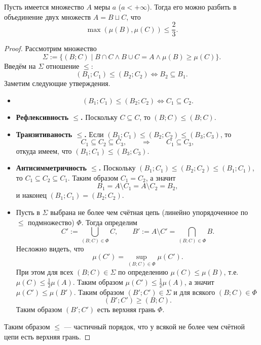 \documentclass[12pt,a4paper]{article}
\begin{document}
    \begin{enumproblem}
        \begin{lemma}\label{best-dividing-lemma}
            Пусть имеется множество $A$ меры $a$ ($a < +\infty$). Тогда его можно разбить в объединение двух множеств $A = B \sqcup C$, что
            \[\max(\mu(B), \mu(C)) \leqslant \frac{2}{3}.\]
        \end{lemma}

        \begin{proof}
            Рассмотрим множество
            \[\Sigma := \{(B; C) \mid B \cap C \wedge B \cup C = A \wedge \mu(B) \geqslant \mu(C)\}.\]
            Введём на $\Sigma$ отношение $\leqslant$:
            \[(B_1; C_1) \leqslant (B_2; C_2) \Longleftrightarrow B_2 \subseteq B_1.\]
            Заметим следующие утверждения.
            \begin{itemize}
                \item 
                    \[(B_1; C_1) \leqslant (B_2; C_2) \Longleftrightarrow C_1 \subseteq C_2.\]
                \item \textbf{Рефлексивность $\leqslant$.} Поскольку $C \subseteq C$, то $(B; C) \leqslant (B; C)$.
                \item \textbf{Транзитиваность $\leqslant$.} Если $(B_1; C_1) \leqslant (B_2; C_2) \leqslant (B_3; C_3)$, то
                    \[C_1 \subseteq C_2 \subseteq C_3, \qquad \Longrightarrow \qquad C_1 \subseteq C_3,\]
                    откуда имеем, что $(B_1; C_1) \leqslant (B_3; C_3)$.
                \item \textbf{Антисимметричность $\leqslant$.} Поскольку $(B_1; C_1) \leqslant (B_2; C_2) \leqslant (B_1; C_1)$, то $C_1 \subseteq C_2 \subseteq C_1$. Таким образом $C_1 = C_2$, а значит
                    \[B_1 = A \setminus C_1 = A \setminus C_2 = B_2,\]
                    и наконец $(B_1; C_1) = (B_2; C_2)$.
                \item Пусть в $\Sigma$ выбрана не более чем счётная цепь (линейно упорядоченное по $\leqslant$ подмножество) $\Phi$. Тогда определим
                    \[C' := \bigcup_{(B; C) \in \Phi} C, \qquad B' := A \setminus C' = \bigcap_{(B; C) \in \Phi} B.\]
                    Несложно видеть, что
                    \[\mu(C') = \sup_{(B; C) \in \Phi} \mu(C').\]
                    При этом для всех $(B; C) \in \Sigma$ по определению $\mu(C) \leqslant \mu(B)$, т.е. $\mu(C) \leqslant \frac{1}{2} \mu(A)$. Таким образом $\mu(C') \leqslant \frac{1}{2} \mu(A)$, а значит $\mu(C') \leqslant \mu(B')$. Таким образом $(B'; C') \in \Sigma$ и для всякого $(B; C) \in \Phi$
                    \[(B'; C') \geqslant (B; C).\]
                    Таким образом $(B'; C')$ есть верхняя грань $\Phi$. 
            \end{itemize}
            Таким образом $\leqslant$ --- частичный порядок, что у всякой не более чем счётной цепи есть верхняя грань.


\end{proof}
\end{enumproblem}
\end{document}
